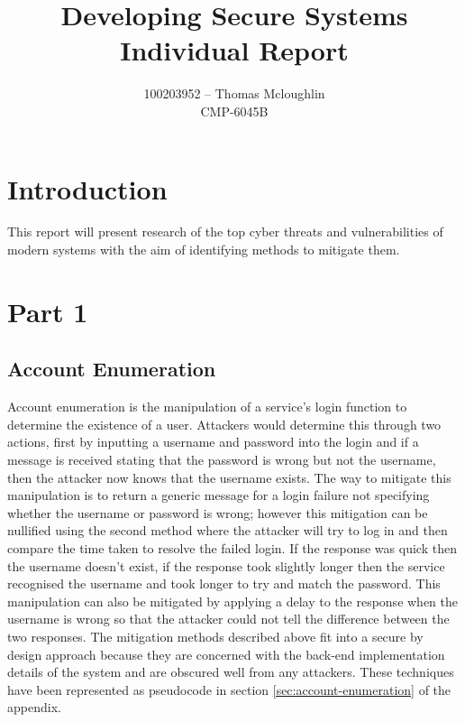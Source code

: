 \documentclass{ueacmpstyle}
\begin{document}
	\title{Developing Secure Systems Individual Report}
	\author{
		100203952 -- Thomas Mcloughlin\\
		CMP-6045B
	}
	\maketitle

    \section{Introduction}\label{sec:Intro}
    This report will present research of the top cyber threats and vulnerabilities of modern 
    systems with the aim of identifying methods to mitigate them.

    \section{Part 1}\label{sec:Pt1}
      
      \subsection{Account Enumeration}\label{sub:AccEnum}
      Account enumeration is the manipulation of a service's login function to determine 
      the existence of a user. Attackers would determine this through two actions, first 
      by inputting a username and password into the login and if a message is received 
      stating that the password is wrong but not the username, then the attacker now 
      knows that the username exists. The way to mitigate this manipulation is to return 
      a generic message for a login failure not specifying whether the username or 
      password is wrong; however this mitigation can be nullified using the second method 
      where the attacker will try to log in and then compare the time taken to resolve the 
      failed login. If the response was quick then the username doesn't exist, if the 
      response took slightly longer then the service recognised the username and took longer 
      to try and match the password. This manipulation can also be mitigated by applying a 
      delay to the response when the username is wrong so that the attacker could not 
      tell the difference between the two responses.
      The mitigation methods described above fit into a secure by design approach because 
      they are concerned with the back-end implementation details of the system and are 
      obscured well from any attackers. These techniques have been represented as 
      pseudocode in section \ref{sec:account-enumeration} of the appendix.
\end{document}
